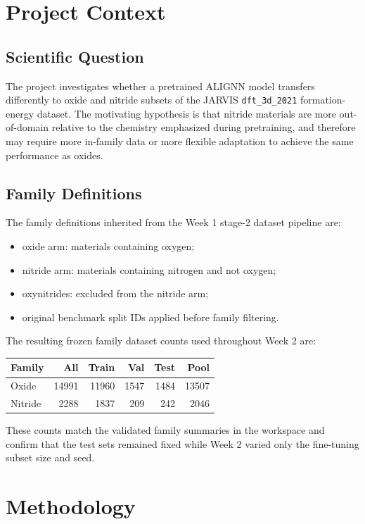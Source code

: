 \documentclass[11pt]{article}
\begin{document}
\section{Project Context}
\subsection{Scientific Question}
The project investigates whether a pretrained ALIGNN model transfers differently to oxide and nitride subsets of the JARVIS \texttt{dft\_3d\_2021} formation-energy dataset.
The motivating hypothesis is that nitride materials are more out-of-domain relative to the chemistry emphasized during pretraining, and therefore may require more in-family data or more flexible adaptation to achieve the same performance as oxides.

\subsection{Family Definitions}
The family definitions inherited from the Week 1 stage-2 dataset pipeline are:
\begin{itemize}
  \item oxide arm: materials containing oxygen;
  \item nitride arm: materials containing nitrogen and not oxygen;
  \item oxynitrides: excluded from the nitride arm;
  \item original benchmark split IDs applied before family filtering.
\end{itemize}

The resulting frozen family dataset counts used throughout Week 2 are:
\begin{center}
\begin{tabular}{lrrrrr}
\toprule
Family & All & Train & Val & Test & Pool \\
\midrule
Oxide   & 14991 & 11960 & 1547 & 1484 & 13507 \\
Nitride &  2288 &  1837 &  209 &  242 &  2046 \\
\bottomrule
\end{tabular}
\end{center}

These counts match the validated family summaries in the workspace and confirm that the test sets remained fixed while Week 2 varied only the fine-tuning subset size and seed.

\section{Methodology}
\end{document}
